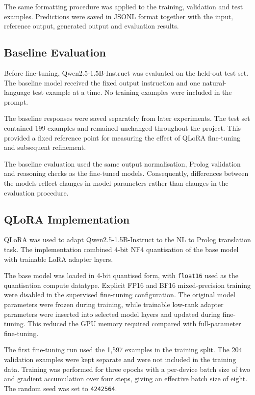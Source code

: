\documentclass[11pt]{article} %
\theoremstyle{plain}
\theoremstyle{definition}
\begin{document}
The same formatting procedure was applied to the training, validation and test
examples. Predictions were saved in JSONL format together with the input,
reference output, generated output and evaluation results.

\subsection{Baseline Evaluation}

Before fine-tuning, Qwen2.5-1.5B-Instruct was evaluated on the held-out test set.
The baseline model received the fixed output instruction and one natural-language
test example at a time. No training examples were included in the prompt.

The baseline responses were saved separately from later experiments. The test
set contained 199 examples and remained unchanged throughout the project. This
provided a fixed reference point for measuring the effect of QLoRA fine-tuning
and subsequent refinement.

The baseline evaluation used the same output normalisation, Prolog validation
and reasoning checks as the fine-tuned models. Consequently, differences between
the models reflect changes in model parameters rather than changes in the
evaluation procedure.

\subsection{QLoRA Implementation}

QLoRA was used to adapt Qwen2.5-1.5B-Instruct to the NL to Prolog translation
task. The implementation combined 4-bit NF4 quantisation of the base model
with trainable LoRA adapter layers.

The base model was loaded in 4-bit quantised form, with \texttt{float16} used
as the quantisation compute datatype. Explicit FP16 and BF16 mixed-precision
training were disabled in the supervised fine-tuning configuration. The
original model parameters were frozen during training, while trainable
low-rank adapter parameters were inserted into selected model layers and
updated during fine-tuning. This reduced the GPU memory required compared
with full-parameter fine-tuning.

The first fine-tuning run used the 1,597 examples in the training split. The
204 validation examples were kept separate and were not included in the
training data. Training was performed for three epochs with a per-device batch
size of two and gradient accumulation over four steps, giving an effective
batch size of eight. The random seed was set to \texttt{4242564}.
\end{document}
